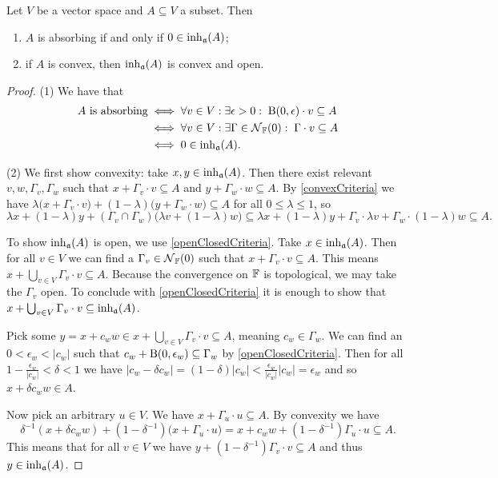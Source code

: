 \begin{proposition} \label{coreProperties}
Let $V$ be a vector space and $A \subseteq V$ a subset. Then
\begin{enumerate}
\item $A$ is absorbing \textup{if and only if} $0\in \operatorname{inh}_\mathfrak{a}(A)$;
\item if $A$ is convex, then $\operatorname{inh}_\mathfrak{a}(A)$ is convex and open.
\end{enumerate}
\end{proposition}
\begin{proof}
(1) We have that
\begin{align*}
\text{$A$ is absorbing} &\iff \forall v\in V: \exists \epsilon >0: \; \operatorname{B}(0,\epsilon)\cdot v\subseteq A \\
&\iff \forall v\in V: \exists \Gamma \in \operatorname{\mathcal{N}}_{\mathbb{F}}(0): \; \Gamma\cdot v\subseteq A \\
&\iff 0\in \operatorname{inh}_\mathfrak{a}(A).
\end{align*}

(2) We first show convexity: take $x,y \in \operatorname{inh}_\mathfrak{a}(A)$. Then there exist relevant $v,w,\Gamma_v,\Gamma_w$ such that $x+ \Gamma_v\cdot v \subseteq A$ and $y+ \Gamma_w\cdot w \subseteq A$. By \ref{convexCriteria} we have $\lambda \big(x+ \Gamma_v\cdot v\big) + (1-\lambda)\big(y+ \Gamma_w\cdot w\big)\subseteq A$ for all $0\leq \lambda \leq 1$, so
\[ \lambda x+(1-\lambda)y + (\Gamma_v\cap\Gamma_w)\big(\lambda v+(1-\lambda)w\big) \subseteq \lambda x+(1-\lambda)y + \Gamma_v\cdot \lambda v+\Gamma_w\cdot (1-\lambda)w \subseteq A. \]

To show $\operatorname{inh}_\mathfrak{a}(A)$ is open, we use \ref{openClosedCriteria}. Take $x\in \operatorname{inh}_\mathfrak{a}(A)$. Then for all $v\in V$ we can find a $\Gamma_v\in\operatorname{\mathcal{N}}_{\mathbb{F}}(0)$ such that $x+\Gamma_v\cdot v \subseteq A$. This means $x+\bigcup_{v\in V}\Gamma_v\cdot v \subseteq A$. Because the convergence on $\mathbb{F}$ is topological, we may take the $\Gamma_v$ open. To conclude with \ref{openClosedCriteria} it is enough to show that $x+\bigcup_{v\in V}\Gamma_v\cdot v \subseteq \operatorname{inh}_\mathfrak{a}(A)$.

Pick some $y = x+ c_w w \in x+ \bigcup_{v\in V}\Gamma_v\cdot v \subseteq A$, meaning $c_w\in\Gamma_w$. We can find an $0<\epsilon_w<|c_w|$ such that $c_w + \operatorname{B}(0,\epsilon_w) \subseteq \Gamma_w$ by \ref{openClosedCriteria}. Then for all $1-\frac{\epsilon_w}{|c_w|}<\delta<1$ we have $|c_w - \delta c_w| = (1-\delta)|c_w| < \frac{\epsilon_w}{|c_w|}|c_w| = \epsilon_w$ and so $x+ \delta c_w w \in A$.

Now pick an arbitrary $u\in V$. We have $x+\Gamma_u\cdot u \subseteq A$. By convexity we have
\[ \delta^{-1}(x+ \delta c_w w) + (1-\delta^{-1})\big(x+\Gamma_u\cdot u\big) = x + c_w w + (1-\delta^{-1})\Gamma_u\cdot u \subseteq A. \]
This means that for all $v\in V$ we have $y + (1-\delta^{-1})\Gamma_v\cdot v \subseteq A$ and thus $y\in \operatorname{inh}_\mathfrak{a}(A)$.
\end{proof}

